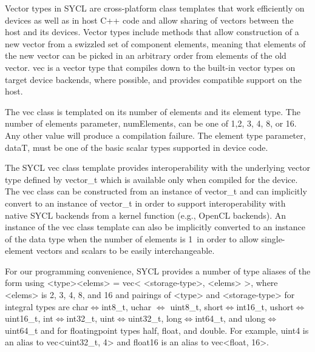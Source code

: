 Vector types in SYCL are cross-platform class templates that work efficiently on devices as well as in host C++ code and allow sharing of vectors between the host and its devices. Vector types include methods that allow construction of a new vector from a swizzled set of component elements, meaning that elements of the new vector can be picked in an arbitrary order from elements of the old vector. vec is a vector type that compiles down to the built-in vector types on target device backends, where possible, and provides compatible support on the host.\par

The vec class is templated on its number of elements and its element type. The number of elements parameter, numElements, can be one of 1,2, 3, 4, 8, or 16. Any other value will produce a compilation failure. The element type parameter, dataT, must be one of the basic scalar types supported in device code.\par

The SYCL vec class template provides interoperability with the underlying vector type defined by vector\_t which is available only when compiled for the device. The vec class can be constructed from an instance of vector\_t and can implicitly convert to an instance of vector\_t in order to support interoperability with native SYCL backends from a kernel function (e.g., OpenCL backends). An instance of the vec class template can also be implicitly converted to an instance of the data type when the number of elements is 1 in order to allow single-element vectors and scalars to be easily interchangeable.\par

For our programming convenience, SYCL provides a number of type aliases of the form using <type><elems> = vec< <storage-type>, <elems> >, where <elems> is 2, 3, 4, 8, and 16 and pairings of <type> and <storage-type> for integral types are char$\Leftrightarrow$int8\_t, uchar $\Leftrightarrow$ uint8\_t, short$\Leftrightarrow$int16\_t, ushort$\Leftrightarrow$uint16\_t, int$\Leftrightarrow$int32\_t, uint$\Leftrightarrow$uint32\_t, long$\Leftrightarrow$int64\_t, and ulong$\Leftrightarrow$uint64\_t and for floatingpoint types half, float, and double. For example, uint4 is an alias to vec<uint32\_t, 4> and float16 is an alias to vec<float, 16>.\par












